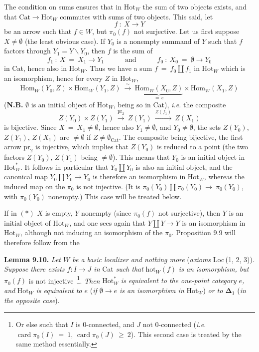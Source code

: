 \documentclass[11pt]{article}
\newcommand{\printedpage}[1]{\marginpar{\footnotesize p.~#1}}
\newcommand{\msp}[1]{\marginpar{\footnotesize [#1]}}
\newcommand{\Hot}{\mathrm{Hot}}
\newcommand{\Hom}{\mathrm{Hom}}
\newcommand{\Cat}{\mathrm{Cat}}
\newcommand{\hot}{\mathrm{hot}}
\newcommand{\card}{\operatorname{card}}
\newcommand{\pr}{\mathrm{pr}}
\begin{document}
\msp{page 131}The condition on sums ensures that in $\Hot_W$ the sum of two objects exists, and that $\Cat\longrightarrow\Hot_W$ commutes with sums of two objects. This said, let
\[
f\ :\ X\longrightarrow Y \tag*{$(*)$} %
\]
be an arrow such that $f\in W$, but $\pi_0(f)$ not surjective. Let us first suppose $X\neq\emptyset$ (the least obvious case). If $Y_0$ is a nonempty summand of $Y$ such that $f$ factors through $Y_1=Y\backslash Y_0$, then $f$ is the sum of
\[
f_1\ :\ X\ =\ X_1\longrightarrow Y_1\qquad\quad\text{and}\qquad\quad f_0\ :\ X_0\ =\ \emptyset\longrightarrow Y_0
\]
in Cat, hence also in $\Hot_W$. Thus we have a sum $f\ =\ f_0\amalg f_1$ in $\Hot_W$ which is an isomorphism, hence for every $Z$ in $\Hot_W$,
\[
\Hom_W(Y_0,Z)\times\Hom_W(Y_1,Z)\ \xrightarrow{\ \sim\ }\ \underbrace{\Hom_W(X_0,Z)}_{=\,e}\times\Hom_W(X_1,Z)
\]
(\textbf{N.B.} $\emptyset$ is an initial object of $\Hot_W$, being so in Cat), \textit{i.e.} the composite
\[
Z(Y_0)\times Z(Y_1)\ \xrightarrow{\pr_2}\ Z(Y_1)\ \xrightarrow{Z(f_1)}\ Z(X_1)
\]
is bijective. Since $X\ =\ X_1\neq\emptyset$, hence also $Y_1\neq\emptyset$, and $Y_0\neq\emptyset$, the sets $Z(Y_0)$, $Z(Y_1)$, $Z(X_1)$ are $\neq\emptyset$ if $Z\neq\emptyset_{\Cat}$. The composite being bijective, the first arrow $\pr_2$ is injective, which implies
\printedpage{71}
\msp{page 132}that $Z(Y_0)$ is reduced to a point (the two factors $Z(Y_0)$, $Z(Y_1)$ being $\neq\emptyset$). This means that $Y_0$ is an initial object in $\Hot_W^*$. It follows in particular that $Y_0\amalg Y_0$ is also an initial object, and the canonical map $Y_0\amalg Y_0\longrightarrow Y_0$ is therefore an isomorphism in $\Hot_W$, whereas the induced map on the $\pi_0$ is not injective. (It is $\pi_0(Y_0)\amalg\pi_0(Y_0)\longrightarrow\ \pi_0(Y_0)$, with $\pi_0(Y_0)$ nonempty.) This case will be treated below.

If in $(*)$ $X$ is empty, $Y$ nonempty (since $\pi_0(f)$ not surjective), then $Y$ is an initial object of $\Hot_W$, and one sees again that $Y\amalg Y\longrightarrow Y$ is an isomorphism in $\Hot_W$, although not inducing an isomorphism of the $\pi_0$. Proposition 9.9 will therefore follow from the

\textbf{Lemma 9.10.} \textit{Let $W$ be a basic localizer and nothing more} (\textit{axioms} Loc\,(1, 2, 3)). \textit{Suppose there exists $f:I\longrightarrow J$ in} Cat \textit{such that} $\hot_W(f)$ \textit{is an isomorphism, but $\pi_0(f)$} is not injective~\footnote[56]{Or else such that $I$ is 0-connected, and $J$ not 0-connected (\textit{i.e.} $\card\pi_0(I)\ =\ 1$, $\card\pi_0(J)\ \geq\ 2$). This second case is treated by the same method essentially.}. \textit{Then} $\Hot_W^*$ \textit{is equivalent to the one-point category $e$, and} $\Hot_W$ \textit{is equivalent to $e$} (\textit{if $\emptyset\longrightarrow e$ is an isomorphism in} $\Hot_W$) \textit{or to $\boldsymbol{\Delta}_1$} (\textit{in the opposite case}).
\end{document}
